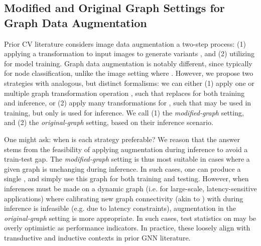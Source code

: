 \documentclass[letterpaper]{article} \usepackage{aaai21}  \usepackage{times}  \usepackage{helvet} \usepackage{courier}  \usepackage[hyphens]{url}  \usepackage{graphicx} \urlstyle{rm} \def\UrlFont{\rm}  \usepackage{natbib}  \usepackage{caption} \frenchspacing  \setlength{\pdfpagewidth}{8.5in}  \setlength{\pdfpageheight}{11in}
\begin{document}
\subsection{Modified and Original Graph Settings for Graph Data Augmentation}
\label{sec:3-3}
Prior CV literature \cite{wang2019survey}  considers image data augmentation a two-step process: (1) applying a transformation  to input images  to generate variants , and (2) utilizing  for model training.  Graph data augmentation is notably different, since typically   for node classification, unlike the image setting where .  However, we propose two strategies with analogous, but distinct formalisms: we can either (1) apply one or multiple graph transformation operation , such that   replaces  for both training and inference, or (2) apply many transformations  for , such that  may be used in training, but only  is used for inference. We call (1) the \emph{modified-graph} setting, and (2) the \emph{original-graph} setting, based on their inference scenario.

One might ask: when is each strategy preferable?   We reason that the answer stems from the feasibility of applying augmentation during inference to avoid a train-test gap.  The \emph{modified-graph} setting is thus most suitable in cases where a given graph is unchanging during inference.  In such cases, one can produce a single , and simply use this graph for both training and testing.  However, when inferences must be made on a dynamic graph (i.e. for large-scale, latency-sensitive applications) where calibrating new graph connectivity (akin to ) with  during inference is infeasible (e.g. due to latency constraints), augmentation in the \emph{original-graph} setting is more appropriate. 
In such cases,  test statistics on  may be overly optimistic as performance indicators. 
In practice, these loosely align with transductive and inductive contexts in prior GNN literature.




 
\end{document}
